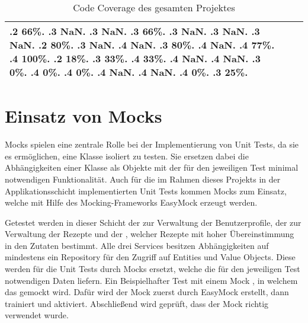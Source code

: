\begin{table}[ht]
\begin{tabular}{|l|c|c|}
\begin{minipage}{2.5cm}
{            .2 66\%.
            .3 NaN.
            .3 NaN.
            .3 66\%.
            .3 NaN.
            .3 NaN.
            .3 NaN.
            .2 80\%.
            .3 NaN.
            .4 NaN.
            .3 80\%.
            .4 NaN.
            .4 77\%.
            .4 100\%.
            .2 18\%.
            .3 33\%.
            .4 33\%.
            .4 NaN.
            .4 NaN.
            .3 0\%.
            .4 0\%.
            .4 0\%.
            .4 NaN.
            .4 NaN.
            .4 0\%.
            .3 25\%.
        }\end{minipage} \\
        \hline
    \end{tabular}
    \caption{Code Coverage des gesamten Projektes}
    \label{tab:code-coverage-full}
\end{table}

\section{Einsatz von Mocks}
\label{sec:mocks}
Mocks spielen eine zentrale Rolle bei der Implementierung von Unit Tests, da sie es ermöglichen, eine Klasse isoliert zu testen. Sie ersetzen dabei die Abhängigkeiten einer Klasse als Objekte mit der für den jeweiligen Test minimal notwendigen Funktionalität. Auch für die im Rahmen dieses Projekts in der Applikationsschicht implementierten Unit Tests kommen Mocks zum Einsatz, welche mit Hilfe des Mocking-Frameworks EasyMock erzeugt werden.

Getestet werden in dieser Schicht der  zur Verwaltung der Benutzerprofile, der  zur Verwaltung der Rezepte und der , welcher Rezepte mit hoher Übereinstimmung in den Zutaten bestimmt. Alle drei Services besitzen Abhängigkeiten auf mindestens ein Repository für den Zugriff auf Entities und Value Objects. Diese werden für die Unit Tests durch Mocks ersetzt, welche die für den jeweiligen Test notwendigen Daten liefern. Ein Beispielhafter Test mit einem Mock \href{https://github.com/anditru/quickie/blob/bb41442c7f1ffbfcd3117cd86a40f7932e543a33/2-quickie-application/src/test/java/org/pinkcrazyunicorn/quickie/application/profile/ProfileServiceTest.java#L18}{}, in welchem das  gemockt wird. Dafür wird der Mock zuerst durch EasyMock erstellt, dann trainiert und aktiviert. Abschließend wird geprüft, dass der Mock richtig verwendet wurde.
